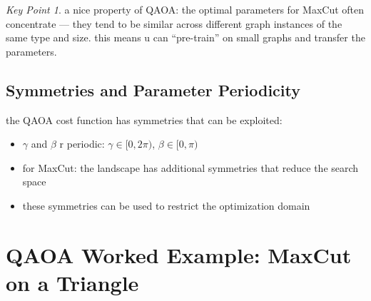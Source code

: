 \documentclass[11pt,a4paper]{article}
\theoremstyle{definition}
\theoremstyle{remark}
\newtheorem*{keypoint}{Key Point}
\begin{document}
\begin{keypoint}
a nice property of QAOA: the optimal parameters for MaxCut often concentrate --- they tend to be similar across different graph instances of the same type and size. this means u can ``pre-train'' on small graphs and transfer the parameters.
\end{keypoint}

\subsection{Symmetries and Parameter Periodicity}

the QAOA cost function has symmetries that can be exploited:
\begin{itemize}
    \item $\gamma$ and $\beta$ r periodic: $\gamma \in [0, 2\pi)$, $\beta \in [0, \pi)$
    \item for MaxCut: the landscape has additional symmetries that reduce the search space
    \item these symmetries can be used to restrict the optimization domain
\end{itemize}

\section{QAOA Worked Example: MaxCut on a Triangle}
\end{document}
